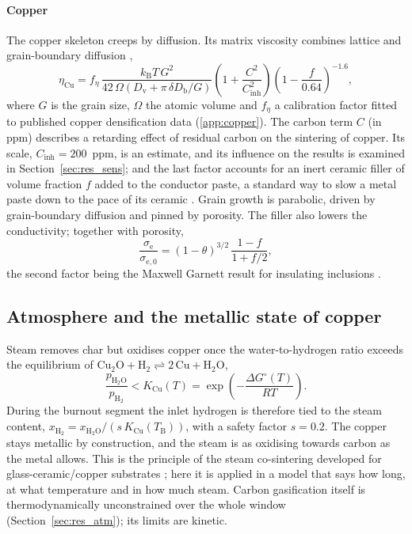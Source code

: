 \paragraph{Copper} The copper skeleton creeps by diffusion. Its matrix viscosity combines lattice and grain-boundary diffusion \cite{frost1982deformation},
\begin{equation}
\eta_{\mathrm{Cu}} = f_\eta\,\frac{k_{\mathrm{B}}T\,G^2}{42\,\Omega\left(D_{\mathrm{v}} + \pi\,\delta D_{\mathrm{b}}/G\right)}\left(1+\frac{C^2}{C_{\mathrm{inh}}^2}\right)\left(1-\frac{f}{0.64}\right)^{-1.6},
\label{eq:etacu}
\end{equation}
where $G$ is the grain size, $\Omega$ the atomic volume and $f_\eta$ a calibration factor fitted to published copper densification data (\ref{app:copper}). The carbon term $C$ (in ppm) describes a retarding effect of residual carbon on the sintering of copper. Its scale, $C_{\mathrm{inh}} = 200$~ppm, is an estimate, and its influence on the results is examined in Section~\ref{sec:res_sens}; and the last factor accounts for an inert ceramic filler of volume fraction $f$ added to the conductor paste, a standard way to slow a metal paste down to the pace of its ceramic \cite{chang1998effects}. Grain growth is parabolic, driven by grain-boundary diffusion and pinned by porosity. The filler also lowers the conductivity; together with porosity,
\begin{equation}
\frac{\sigma_{\mathrm{e}}}{\sigma_{\mathrm{e},0}} = (1-\theta)^{3/2}\,\frac{1-f}{1+f/2},
\label{eq:conductivity}
\end{equation}
the second factor being the Maxwell Garnett result for insulating inclusions \cite{garnett1904colours}.

\subsection{Atmosphere and the metallic state of copper}
\label{sec:atmosphere}

Steam removes char but oxidises copper once the water-to-hydrogen ratio exceeds the equilibrium of $\mathrm{Cu_2O} + \mathrm{H_2} \rightleftharpoons 2\,\mathrm{Cu} + \mathrm{H_2O}$,
\begin{equation}
\frac{p_{\mathrm{H_2O}}}{p_{\mathrm{H_2}}} < K_{\mathrm{Cu}}(T) = \exp\!\left(-\frac{\Delta G^\circ(T)}{RT}\right).
\label{eq:cuwindow}
\end{equation}
During the burnout segment the inlet hydrogen is therefore tied to the steam content, $x_{\mathrm{H_2}} = x_{\mathrm{H_2O}}/(s\,K_{\mathrm{Cu}}(T_{\mathrm{B}}))$, with a safety factor $s = 0.2$. The copper stays metallic by construction, and the steam is as oxidising towards carbon as the metal allows. This is the principle of the steam co-sintering developed for glass-ceramic/copper substrates \cite{master1991cosintering,tummala1991ceramic}; here it is applied in a model that says how long, at what temperature and in how much steam. Carbon gasification itself is thermodynamically unconstrained over the whole window (Section~\ref{sec:res_atm}); its limits are kinetic.

